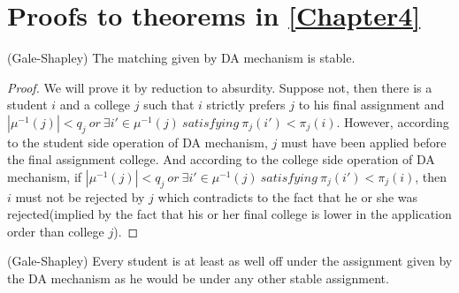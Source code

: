 
\chapter{Proofs to theorems in \ref{Chapter4}} %

\label{Appendix_D} %


\begin{thm*}(Gale-Shapley)
The matching given by DA mechanism is stable.
\end{thm*}

\begin{proof}
We will prove it by reduction to absurdity. Suppose not, then there is
a student $i$ and  a college $j$  such that $i$ strictly prefers $j$ to his
final assignment and $|\mu^{-1}(j)|< q_j\ or\  \exists i' \in
\mu^{-1}(j)\  satisfying\ \pi_{j}(i') < \pi_{j}(i)$.  However,
according to the student side operation of DA mechanism,  $j$ must have been applied before the
final assignment college. And  according to the college side operation
of DA mechanism, if  $|\mu^{-1}(j)|< q_j\ or\  \exists i' \in
\mu^{-1}(j)\  satisfying\ \pi_{j}(i') < \pi_{j}(i)$, then $i$ must not
be rejected by $j$ which contradicts to the fact that he or she was
rejected(implied by the fact that his or her final college is lower in
the application order than college $j$).
\end{proof}
\begin{thm*}(Gale-Shapley)
Every student is at least as well off under the assignment given by
the DA mechanism as he would be under any other stable assignment.
\end{thm*}

